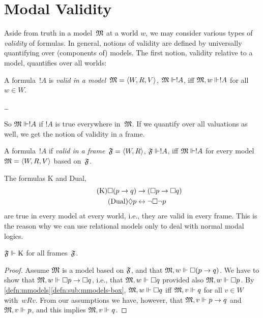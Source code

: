 \documentclass[modal-logic]{subfiles}
\begin{document}
\section{Modal Validity}

Aside from truth in a model~$\mathfrak M$ at a world $w$, we may consider various  types of \emph{validity} of formulas.  In general, notions of validity are defined by universally quantifying over (components of) models.  The first notion, validity relative to a model, quantifies over all worlds:

\begin{defn}\label{defn:valid-in-model}
A formula~$!A$ is \emph{valid in a model}~$\mathfrak M = \langle W, R, V\rangle$, $\mathfrak M \Vdash !A$, iff $\mathfrak M, w \Vdash !A$ for all $w \in W$.
\end{defn}

\begin{ex}
\dots
\end{ex}

So $\mathfrak M \Vdash !A$ if $!A$ is true everywhere in~$\mathfrak M$. If we quantify over all valuations as well, we get the notion of validity in a frame.

\begin{defn}\label{valid-in-frame}
A formula~$!A$ if \emph{valid in a frame}~$\mathfrak F = \langle W, R\rangle$,
$\mathfrak F \Vdash !A$, iff $\mathfrak M \Vdash !A$ for every model~$\mathfrak M = \langle W, R, V\rangle$ based on~$\mathfrak F$.
\end{defn}

The formulas K and Dual,
\begin{align}
\tag{K} \Box(p \to q) & \to (\Box p \to \Box q) \\
\tag{Dual} \Diamond p & \leftrightarrow \lnot\Box\lnot p
\end{align}
are true in every model at every world, i.e., they are valid in every frame.  This is the reason why we can use relational models only to deal with normal modal logics. 

\begin{prop}
$\mathfrak F \Vdash \mathrm{K}$ for all frames~$\mathfrak F$.
\end{prop}

\begin{proof}
Assume $\mathfrak M$ is a model based on $\mathfrak F$, and that $\mathfrak M, w \Vdash \Box(p \to q)$. We have to show that $\mathfrak M, w \Vdash \Box p \to \Box q$, i.e., that $\mathfrak M, w \Vdash \Box q$ provided also $\mathfrak M, w \Vdash \Box p$.  By \ref{defn:mmodels}\ref{defn:sub:mmodels-box}, $\mathfrak M, w \Vdash \Box q$ iff $\mathfrak M, v \Vdash q$ for all $v \in W$ with~$wRv$. From our assumptions we have, however, that $\mathfrak M, v \Vdash p \to q$ and $\mathfrak M, v \Vdash p$, and this implies $\mathfrak M, v \Vdash q$. 
\end{proof}
\end{document}
